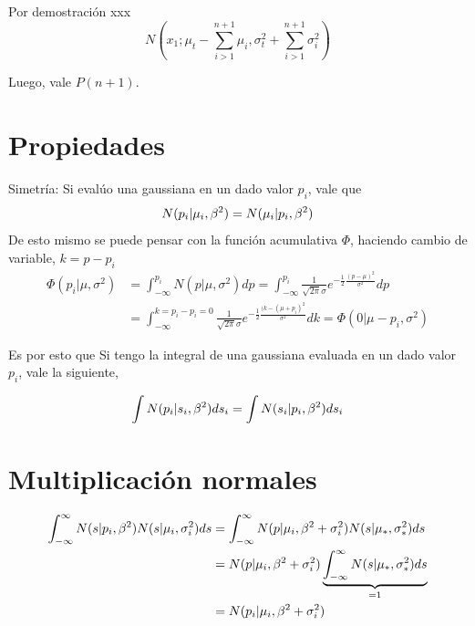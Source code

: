 \documentclass[11pt,twoside, spanish]{report} %
\begin{document}
Por demostraci\'on xxx%
\begin{equation}
	N\left(x_1;\mu_t-\sum_{i>1}^{n+1} \mu_i,\sigma_t^2+\sum_{i>1}^{n+1}\sigma_i^2\right)
\end{equation}

Luego, vale $P(n+1)$.


%


\section{Propiedades}

Simetr\'ia:  Si eval\'uo una gaussiana en un dado valor $p_i$, vale que
\begin{equation}
	\centering
	N(p_i \vert \mu_i,\beta^2) =  N(\mu_i \vert p_i,\beta^2)
\end{equation}
De esto mismo se puede pensar con la funci\'on acumulativa $\Phi$, haciendo cambio de variable, $k=p-p_i$
\begin{equation}
	\begin{split}
		\Phi(p_i \vert \mu,\sigma^2) &= \int_{-\infty}^{p_i} N(p \vert \mu,\sigma^2) dp = \int_{-\infty}^{p_i} \frac{1}{\sqrt{2\pi}\sigma}e^{-\frac{1}{2}\frac{(p-\mu)^2}{\sigma^2}} dp\\
		& = \int_{-\infty}^{k=p_i-p_i=0} \frac{1}{\sqrt{2\pi}\sigma}e^{-\frac{1}{2}\frac{(k-(\mu+p_i)^2}{\sigma^2}}dk= \Phi(0 \vert \mu-p_i,\sigma^2)
	\end{split}
\end{equation}

Es por esto que Si tengo la integral de una gaussiana evaluada en un dado valor $p_i$, vale la siguiente,

\begin{equation}\label{eq:simetria}
	\centering
	\int N(p_i \vert s_i,\beta^2) ds_i =  \int N(s_i \vert p_i,\beta^2)ds_i
\end{equation}


\section{Multiplicaci\'on normales}

\begin{equation}
	\centering
	\begin{split}
		\int_{-\infty}^{\infty} N(s \vert p_i,\beta^2) N(s \vert \mu_i,\sigma_i^2)ds
		& = \int_{-\infty}^{\infty} N(p \vert \mu_i,\beta^2+\sigma_i^2) N(s \vert \mu_{\ast},\sigma_{\ast}^2)ds \\
		& = N(p \vert \mu_i,\beta^2+\sigma_i^2) \underbrace{\int_{-\infty}^{\infty}  N(s \vert \mu_{\ast},\sigma_{\ast}^2)ds}_{=1} \\
		& =  N(p_i \vert \mu_i,\beta^2+\sigma_i^2)
	\end{split}
\end{equation}
\end{document}
